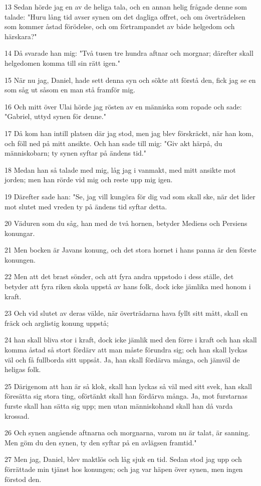 \par 13 Sedan hörde jag en av de heliga tala, och en annan helig frågade denne som talade: "Huru lång tid avser synen om det dagliga offret, och om överträdelsen som kommer åstad förödelse, och om förtrampandet av både helgedom och härskara?"
\par 14 Då svarade han mig: "Två tusen tre hundra aftnar och morgnar; därefter skall helgedomen komma till sin rätt igen."
\par 15 När nu jag, Daniel, hade sett denna syn och sökte att förstå den, fick jag se en som såg ut såsom en man stå framför mig.
\par 16 Och mitt över Ulai hörde jag rösten av en människa som ropade och sade: "Gabriel, uttyd synen för denne."
\par 17 Då kom han intill platsen där jag stod, men jag blev förskräckt, när han kom, och föll ned på mitt ansikte. Och han sade till mig: "Giv akt härpå, du människobarn; ty synen syftar på ändens tid."
\par 18 Medan han så talade med mig, låg jag i vanmakt, med mitt ansikte mot jorden; men han rörde vid mig och reste upp mig igen.
\par 19 Därefter sade han: "Se, jag vill kungöra för dig vad som skall ske, när det lider mot slutet med vreden ty på ändens tid syftar detta.
\par 20 Väduren som du såg, han med de två hornen, betyder Mediens och Persiens konungar.
\par 21 Men bocken är Javans konung, och det stora hornet i hans panna är den förste konungen.
\par 22 Men att det brast sönder, och att fyra andra uppstodo i dess ställe, det betyder att fyra riken skola uppstå av hans folk, dock icke jämlika med honom i kraft.
\par 23 Och vid slutet av deras välde, när överträdarna hava fyllt sitt mått, skall en fräck och arglistig konung uppstå;
\par 24 han skall bliva stor i kraft, dock icke jämlik med den förre i kraft och han skall komma åstad så stort fördärv att man måste förundra sig; och han skall lyckas väl och få fullborda sitt uppsåt. Ja, han skall fördärva många, och jämväl de heligas folk.
\par 25 Därigenom att han är så klok, skall han lyckas så väl med sitt svek, han skall föresätta sig stora ting, oförtänkt skall han fördärva många. Ja, mot furstarnas furste skall han sätta sig upp; men utan människohand skall han då varda krossad.
\par 26 Och synen angående aftnarna och morgnarna, varom nu är talat, är sanning. Men göm du den synen, ty den syftar på en avlägsen framtid."
\par 27 Men jag, Daniel, blev maktlös och låg sjuk en tid. Sedan stod jag upp och förrättade min tjänst hos konungen; och jag var häpen över synen, men ingen förstod den.

